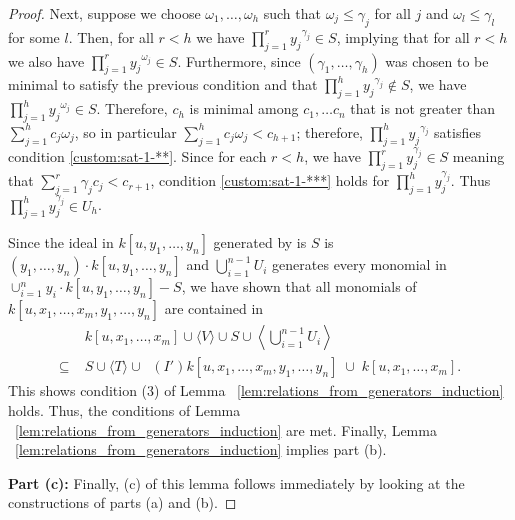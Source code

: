 \documentclass{amsart}
\theoremstyle{plain}
\theoremstyle{definition}
\theoremstyle{remark}
\numberwithin{equation}{section}
\DeclareMathOperator{\initial}{in_\prec}
\begin{document}
\begin{proof}
Next, suppose we choose $\omega_1, \ldots, \omega_h$ such that $\omega_j\le \gamma_j$ for all $j$ and $\omega_l \le \gamma_l$ for some $l$.  Then, for all $r< h$ we have $\prod_{j=1}^r {y_j}^{\gamma_j}\in S$, implying that for all $r< h$ we also have $\prod_{j=1}^r {y_j}^{\omega_j}\in S$.  Furthermore, since $(\gamma_1, \ldots, \gamma_h)$ was chosen to be minimal to satisfy the previous condition and that $\prod_{j=1}^h {y_j}^{\gamma_j}\not\in S$, we have $\prod_{j=1}^h {y_j}^{\omega_j}\in S$.  Therefore, $c_h$ is minimal among $c_1, \ldots c_n$ that is not greater than $\sum_{j=1}^h c_j \omega_j$, so in particular $\sum_{j=1}^h c_j\omega_j < c_{h+1}$; therefore, $\prod_{j=1}^h {y_j}^{\gamma_j}$ satisfies condition \ref{custom:sat-1-**}.  
Since for each $r<h$, we have $\prod_{j=1}^r y_{j}^{\gamma_j}\in S$ meaning that $\sum_{j=1}^r \gamma_j c_j < c_{r+1}$, condition \ref{custom:sat-1-***} holds for $\prod_{j=1}^h y_j^{\gamma_j}$.  
Thus $\prod_{j=1}^h y_j^{\gamma_j}\in U_{h}$.

Since the ideal in $k[u, y_1, \ldots, y_n]$ generated by is $S$ is $(y_1, \ldots, y_n) \cdot k[u, y_1, \ldots, y_n]$ and $\bigcup_{i=1}^{n-1} U_i$ generates every monomial in $\cup_{i=1}^n y_i \cdot k[u, y_1, \ldots, y_n]-S$, we have shown that all monomials of $k[u, x_1, \ldots, x_m, y_1, \ldots, y_n]$ are contained in
\begin{align*}
				& k[u, x_1, \ldots, x_m] \cup \langle V \rangle \cup S \cup \left\langle \bigcup_{i=1}^{n-1} U_i \right\rangle \\
	\subseteq \; 	& S \cup \langle T\rangle \cup \initial(I') k[u, x_1, \ldots, x_m, y_1, \ldots, y_n] \; \cup \; k[u, x_1, \ldots, x_m].
\end{align*}
This shows condition (3) of Lemma ~\ref{lem:relations_from_generators_induction} holds.  Thus, the conditions of 
Lemma ~\ref{lem:relations_from_generators_induction} are met. Finally, Lemma ~\ref{lem:relations_from_generators_induction} implies part (b).

{\bf Part (c):}
Finally, (c) of this lemma follows immediately by looking at the constructions of parts (a) and (b).  







\end{proof}
\end{document}
